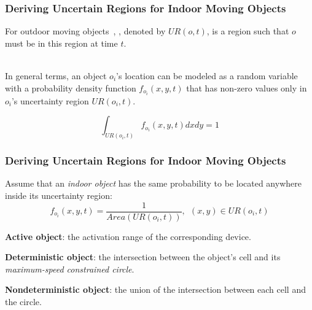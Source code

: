 
\begin{frame}
\frametitle{Deriving Uncertain Regions for Indoor Moving Objects}

\textrm{For outdoor moving objects~\cite{cheng2004querying}, , denoted by ${UR(o,t)}$, is a region such that ${o}$ must be in this region at time ${t}$.}\\~

In general terms, an object ${o_i}$'s location can be modeled as a random variable with a probability density function ${f_{o_i}(x,y,t)}$ that has non-zero values only in ${o_i}$'s uncertainty region ${UR(o_i, t)}$.

\begin{equation}
  {\int_{UR(o_i,t)} f_{o_i}(x,y,t) dx dy = 1}
\end{equation}

\end{frame}


\begin{frame}
\frametitle{Deriving Uncertain Regions for Indoor Moving Objects}

Assume that an \emph{indoor object} has the same probability to be located anywhere inside its uncertainty region:
\begin{equation}
  {f_{o_i}(x,y,t) = \frac{1}{Area(UR(o_i, t))}, ~~(x,y) \in UR(o_i, t)}
\end{equation}

\begin{fitemize}
  \item \textbf{Active object}: the activation range of the corresponding device.
  \item \textbf{Deterministic object}: the intersection between the object's cell and its \emph{maximum-speed constrained circle}.
  \item \textbf{Nondeterministic object}: the union of the intersection between each cell and the circle.
\end{fitemize}

\end{frame}


